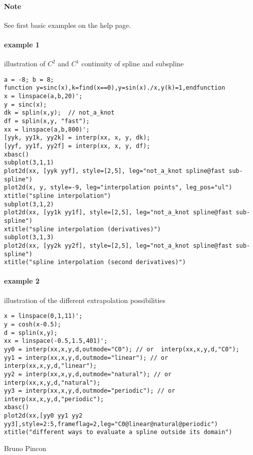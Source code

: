   \begin{examples}

\paragraph{Note} See first basic examples on the   help page.

\paragraph{example 1}  illustration of $C^2$ and $C^1$ continuity of spline and subspline
\begin{Verbatim}
a = -8; b = 8;
function y=sinc(x),k=find(x==0),y=sin(x)./x,y(k)=1,endfunction
x = linspace(a,b,20)';
y = sinc(x);
dk = splin(x,y);  // not_a_knot
df = splin(x,y, "fast");
xx = linspace(a,b,800)';
[yyk, yy1k, yy2k] = interp(xx, x, y, dk); 
[yyf, yy1f, yy2f] = interp(xx, x, y, df); 
xbasc()
subplot(3,1,1)
plot2d(xx, [yyk yyf], style=[2,5], leg="not_a_knot spline@fast sub-spline")
plot2d(x, y, style=-9, leg="interpolation points", leg_pos="ul")
xtitle("spline interpolation")
subplot(3,1,2)
plot2d(xx, [yy1k yy1f], style=[2,5], leg="not_a_knot spline@fast sub-spline")
xtitle("spline interpolation (derivatives)")
subplot(3,1,3)
plot2d(xx, [yy2k yy2f], style=[2,5], leg="not_a_knot spline@fast sub-spline")
xtitle("spline interpolation (second derivatives)")
\end{Verbatim}

\paragraph{example 2} illustration of the different extrapolation possibilities
\begin{Verbatim}
x = linspace(0,1,11)';
y = cosh(x-0.5);
d = splin(x,y);
xx = linspace(-0.5,1.5,401)';
yy0 = interp(xx,x,y,d,outmode="C0"); // or  interp(xx,x,y,d,"C0");
yy1 = interp(xx,x,y,d,outmode="linear"); // or interp(xx,x,y,d,"linear");
yy2 = interp(xx,x,y,d,outmode="natural"); // or interp(xx,x,y,d,"natural");
yy3 = interp(xx,x,y,d,outmode="periodic"); // or interp(xx,x,y,d,"periodic");
xbasc()
plot2d(xx,[yy0 yy1 yy2 yy3],style=2:5,frameflag=2,leg="C0@linear@natural@periodic")
xtitle("different ways to evaluate a spline outside its domain")
\end{Verbatim}

\end{examples}

\begin{manseealso}
\end{manseealso}

\begin{authors}
    Bruno Pincon
\end{authors}

